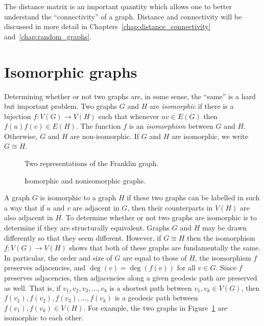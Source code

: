 The distance matrix is an important quantity which allows one to
better understand the ``connectivity'' of a graph. Distance and
connectivity will be discussed in more detail in
Chapters~\ref{chap:distance_connectivity}
and~\ref{chap:random_graphs}.



\section{Isomorphic graphs}
\label{chap:introduction:isomorphic_graphs}

Determining whether or not two graphs are, in some sense, the ``same''
is a hard but important problem. Two graphs $G$ and $H$ are
\emph{isomorphic} if there is a bijection
$f: V(G) \to V(H)$ such that whenever $uv \in E(G)$ then
$f(u) f(v) \in E(H)$. The function $f$ is an \emph{isomorphism}
between $G$ and $H$. Otherwise, $G$ and $H$ are non-isomorphic. If
$G$ and $H$ are isomorphic, we write $G \cong H$.
\index{$\cong$}

\begin{figure}[!htbp]
\centering

\caption{Two representations of the Franklin graph.}
\label{fig:introduction:isomorphic_Franklin_graph}
\end{figure}

\begin{figure}[!htbp]
\centering

\caption{Isomorphic and nonisomorphic graphs.}
\label{fig:introduction:isomorphic_graphs}
\end{figure}

A graph $G$ is isomorphic to a graph $H$ if these two graphs can be
labelled in such a way that if $u$ and $v$ are adjacent in $G$, then
their counterparts in $V(H)$ are also adjacent in $H$. To determine
whether or not two graphs are isomorphic is to determine if they are
structurally equivalent. Graphs $G$ and $H$ may be drawn differently
so that they seem different. However, if $G \cong H$ then the
isomorphism $f: V(G) \to V(H)$ shows that both of these
graphs are fundamentally the same. In particular, the order and size
of $G$ are equal to those of $H$, the isomorphism $f$ preserves
adjacencies, and $\deg(v) = \deg(f(v))$ for all $v \in G$. Since $f$
preserves adjacencies, then adjacencies along a given geodesic path
are preserved as well. That is, if $v_1, v_2, v_3, \dots, v_k$ is a
shortest path between $v_1, v_k \in V(G)$, then
$f(v_1), f(v_2), f(v_3), \dots, f(v_k)$ is a geodesic path between
$f(v_1), f(v_k) \in V(H)$. For example, the two graphs in
Figure~\ref{fig:introduction:isomorphic_Franklin_graph} are isomorphic
to each other.

